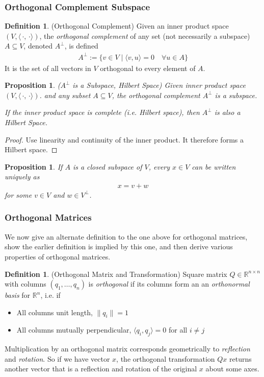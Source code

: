 \documentclass[12pt]{book}
\numberwithin{equation}{section} %
\theoremstyle{plain}
\newtheorem{prop}[thm]{Proposition}
\theoremstyle{definition}
\newtheorem{defn}[thm]{Definition}
\theoremstyle{remark}
\newcommand{\Rn}{\mathbb{R}^n}
\newcommand{\Rnn}{\mathbb{R}^{n\times n}}
\begin{document}
\clearpage
\subsubsection{Orthogonal Complement Subspace}

\begin{defn}(Orthogonal Complement)
Given an inner product space $(V,\langle\,\cdot,\,\cdot\rangle)$, the
\emph{orthogonal complement} of
any set (not necessarily a subspace) $A\subseteq V$, denoted
$A^\perp$, is defined
\begin{align*}
  A^\perp :=
  \{
    v \in V \;|\; \langle v,u\rangle = 0
    \quad \forall u\in A
  \}
\end{align*}
It is the set of all vectors in $V$ orthogonal to every element of $A$.
\end{defn}

\begin{prop}
\emph{($A^\perp$ is a Subspace, Hilbert Space)}
Given inner product space $(V,\langle\,\cdot,\,\cdot\rangle)$.  and any
subset $A\subseteq V$, the orthogonal complement $A^\perp$ is a
subspace.

If the inner product space is complete (i.e. Hilbert space),
then $A^\perp$ is also a Hilbert Space.
\end{prop}
\begin{proof}
Use linearity and continuity of the inner product.
It therefore forms a Hilbert space.
\end{proof}

\begin{prop}
If $A$ is a closed subspace of $V$, every $x\in V$ can be written
uniquely as
\begin{align*}
  x = v + w
\end{align*}
for some $v\in V$ and $w\in V^\perp$.
\end{prop}



\subsubsection{Orthogonal Matrices}

We now give an alternate definition to the one above for orthogonal
matrices, show the earlier definition is implied by this one, and then
derive various properties of orthogonal matrices.

\begin{defn}(Orthogonal Matrix and Transformation)
Square matrix $Q\in\Rnn$ with columns $(q_1,\ldots,q_n)$ is
\emph{orthogonal} if its columns form an an \emph{orthonormal basis} for
$\Rn$, i.e. if
\begin{itemize}
  \item All columns unit length, $\lVert q_i\rVert = 1$
  \item All columns mutually perpendicular,
    $\langle q_i, q_j\rangle =0$ for all $i\neq j$
\end{itemize}
Multiplication by an orthogonal matrix corresponds geometrically to
\emph{reflection} and \emph{rotation}. So if we have vector $x$, the
orthogonal transformation $Qx$ returns another vector that is a
reflection and rotation of the original $x$ about some axes.
\end{defn}
\end{document}
